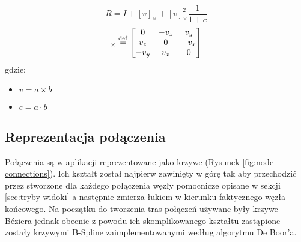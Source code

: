 \newcommand\dotProd{a \cdot b}
\newcommand\crossProd[1]{(\overrightarrow{a \times b})_#1}
\begin{equation}
	R = I + [v]_{\times} + [v]_{\times}^2\frac{1}{1 + c}
\end{equation}
\begin{equation}
	[v]_{\times} \stackrel{\rm def}{=} 
	\begin{bmatrix}
		0 & -v_z & v_y\\
		v_z & 0 & -v_x\\
		-v_y & v_x & 0
	\end{bmatrix}
\end{equation}
gdzie:
\begin{itemize}
	\item \(v = a \times b\)
	\item \(c = a \cdot b\)
\end{itemize}

\subsection{Reprezentacja połączenia}
Połączenia są w aplikacji reprezentowane jako krzywe (Rysunek \ref{fig:node-connections}). Ich kształt został najpierw zawinięty w górę tak aby przechodzić przez stworzone dla każdego połączenia węzły pomocnicze opisane w sekcji \ref{sec:tryby-widoki} a następnie zmierza łukiem w kierunku faktycznego węzła końcowego. Na początku do tworzenia tras połączeń używane były krzywe Béziera jednak obecnie z powodu ich skomplikowanego kształtu zastąpione zostały krzywymi B-Spline zaimplementowanymi według algorytmu De Boor'a.

